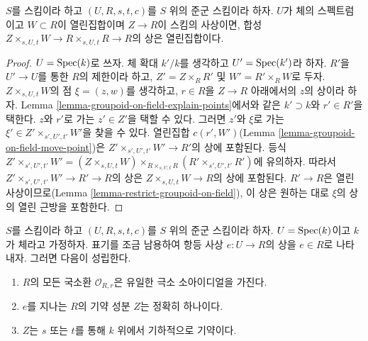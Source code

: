 \begin{lemma}
\label{lemma-groupoid-on-field-translate-open}
$S$를 스킴이라 하고 $(U, R, s, t, c)$를 $S$ 위의 준군 스킴이라 하자.
$U$가 체의 스펙트럼이고 $W \subset R$이 열린집합이며 $Z \to R$이
스킴의 사상이면, 합성
$Z \times_{s, U, t} W \to R \times_{s, U, t} R \to R$의 상은 열린집합이다.
\end{lemma}

\begin{proof}
$U = \mathop{\mathrm{Spec}}(k)$로 쓰자. 체 확대 $k'/k$를 생각하고 $U' = \mathop{\mathrm{Spec}}(k')$라 하자.
$R'$을 $U' \to U$를 통한 $R$의 제한이라 하고,
$Z' = Z \times_R R'$ 및 $W' = R' \times_R W$로 두자.
$Z \times_{s, U, t} W$의 점 $\xi = (z, w)$를 생각하고,
$r \in R$을 $Z \to R$ 아래에서의 $z$의 상이라 하자.
Lemma \ref{lemma-groupoid-on-field-explain-points}에서와 같은
$k' \supset k$와 $r' \in R'$을 택한다. $z$와 $r'$로 가는
$z' \in Z'$을 택할 수 있다. 그러면 $z'$와 $\xi$로 가는
$\xi' \in Z' \times_{s', U', t'} W'$을 찾을 수 있다. 열린집합
$c(r', W')$(Lemma \ref{lemma-groupoid-on-field-move-point})은
$Z' \times_{s', U', t'} W' \to R'$의 상에 포함된다. 등식
$Z' \times_{s', U', t'} W' = (Z \times_{s, U, t} W)
\times_{R \times_{s, U, t} R} (R' \times_{s', U', t'} R')$에 유의하자.
따라서 $Z' \times_{s', U', t'} W' \to R' \to R$의 상은
$Z \times_{s, U, t} W \to R$의 상에 포함된다.
$R' \to R$은 열린 사상이므로(Lemma
\ref{lemma-restrict-groupoid-on-field}), 이 상은 원하는 대로 $\xi$의 상의
열린 근방을 포함한다.
\end{proof}

\begin{lemma}
\label{lemma-groupoid-on-field-geometrically-irreducible}
$S$를 스킴이라 하고 $(U, R, s, t, c)$를 $S$ 위의 준군 스킴이라 하자.
$U = \mathop{\mathrm{Spec}}(k)$이고 $k$가 체라고 가정하자. 표기를 조금 남용하여 항등 사상
$e : U \to R$의 상을 $e \in R$로 나타내자. 그러면 다음이 성립한다.
\begin{enumerate}
\item $R$의 모든 국소환 $\mathcal{O}_{R, r}$은 유일한 극소 소아이디얼을 가진다.
\item $e$를 지나는 $R$의 기약 성분 $Z$는 정확히 하나이다.
\item $Z$는 $s$ 또는 $t$를 통해 $k$ 위에서 기하적으로 기약이다.
\end{enumerate}
\end{lemma}

